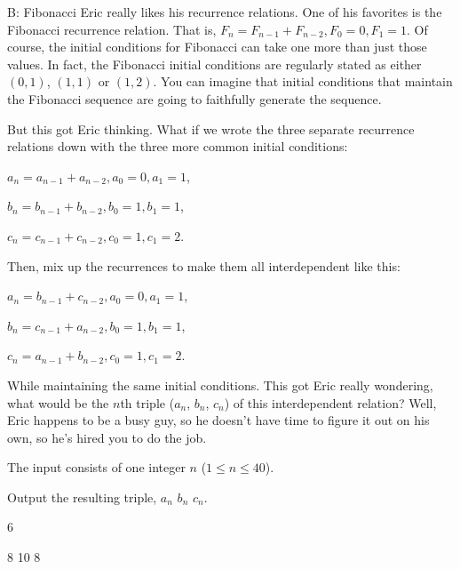 \begin{problem}{B: Fibonacci}
Eric really likes his recurrence relations.
One of his favorites is the Fibonacci recurrence relation.
That is, $F_n = F_{n-1} + F_{n-2}, F_0 = 0, F_1 = 1$.
Of course, the initial conditions for Fibonacci can take one more than just those values.
In fact, the Fibonacci initial conditions are regularly stated as either $(0, 1)$, $(1, 1)$ or $(1, 2)$.
You can imagine that initial conditions that maintain the Fibonacci sequence are going to faithfully generate the sequence.

But this got Eric thinking.
What if we wrote the three separate recurrence relations down with the three more common initial conditions:

$a_n = a_{n-1} + a_{n-2}, a_0 = 0, a_1 = 1$,

$b_n = b_{n-1} + b_{n-2}, b_0 = 1, b_1 = 1$,

$c_n = c_{n-1} + c_{n-2}, c_0 = 1, c_1 = 2$.

Then, mix up the recurrences to make them all interdependent like this:

$a_n = b_{n-1} + c_{n-2}, a_0 = 0, a_1 = 1$,

$b_n = c_{n-1} + a_{n-2}, b_0 = 1, b_1 = 1$,

$c_n = a_{n-1} + b_{n-2}, c_0 = 1, c_1 = 2$.

While maintaining the same initial conditions.
This got Eric really wondering, what would be the $n$th triple ($a_n$, $b_n$, $c_n$) of this interdependent relation?
Well, Eric happens to be a busy guy, so he doesn't have time to figure it out on his own, so he's hired you to do the job.

\end{problem}

\begin{formalin}
The input consists of one integer $n$ ($1 \leq n \leq 40$).
\end{formalin}

\begin{formalout}
Output the resulting triple, $a_n$ $b_n$ $c_n$.
\end{formalout}

\begin{datain}
6
\end{datain}
\begin{dataout}
8 10 8
\end{dataout}
